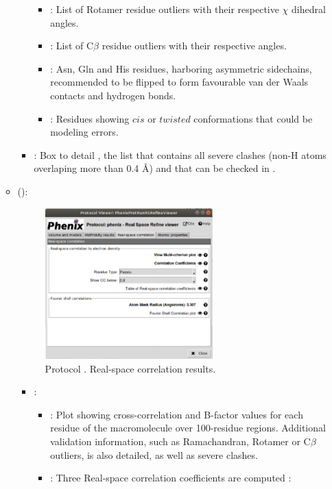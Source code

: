 \begin{itemize}
\begin{itemize}
\begin{itemize}
\begin{itemize}
          \item {}: List of Rotamer residue outliers with their respective $\chi$ dihedral angles.
          \item {}: List of C{$\beta$} residue outliers with their respective angles.
          \item {}: Asn, Gln and His residues, harboring asymmetric sidechains, recommended to be flipped to form favourable van der Waals contacts and hydrogen bonds.
          \item {}: Residues showing $cis$ or $twisted$ conformations that could be modeling errors.
         \end{itemize}

         \item {}: Box to detail , the list that contains all severe clashes (non-H atoms overlaping more than 0.4 \AA) and that can be checked in \coot.
        \end{itemize}
      \item {} ():
       \begin{figure}[H]
         \centering 
         \captionsetup{width=.7\linewidth} 
         \includegraphics[width=0.65\textwidth]{Images_appendix/Fig151.pdf}
         \caption{Protocol . Real-space correlation results.}
         \label{fig:app_protocol_real_space_refine_4}
        \end{figure}
        \begin{itemize}
         \item {}: 
         \begin{itemize}
          \item {}: Plot showing cross-correlation and B-factor values for each residue of the macromolecule over 100-residue regions. Additional validation information, such as Ramachandran, Rotamer or C{$\beta$} outliers, is also detailed, as well as severe clashes.  
          \item {}: Three Real-space correlation coefficients are computed \citep{afonine2018b}: \setlength{\parindent}{12pt}
          

\end{itemize}
\end{itemize}
\end{itemize}
\end{itemize}
